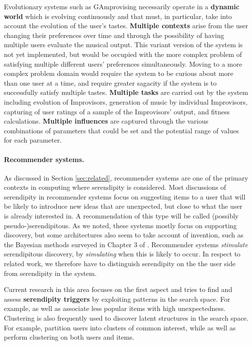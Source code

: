 Evolutionary systems such as {\sf GAmprovising} necessarily operate in a \textbf{dynamic world} which is evolving continuously and that must, in particular, take into account the evolution of the user's tastes. \textbf{Multiple contexts} arise from  the user changing their preferences over time and through the possibility of having multiple users evaluate the musical output.  This variant version of the system is not yet implemented, but would be occupied with the more complex problem of satisfying multiple different users' preferences simultaneously.  Moving to a more complex problem domain would require the system to be curious about more than one user at a time, and require greater sagacity if the system is to successfully satisfy multiple tastes.  \textbf{Multiple tasks} are carried out by the system including evolution of Improvisors, generation of music by individual Improvisors, capturing of user ratings of a sample of the Improvisors' output, and fitness calculations.  \textbf{Multiple influences} are captured through the various combinations of parameters that could be set and the potential range of values for each parameter. 

\paragraph{Recommender systems.} 
As discussed in Section \ref{sec:related}, recommender systems are one
of the primary contexts in computing where serendipity is considered. Most discussions of serendipity in recommender systems focus on suggesting items to a user that will be likely to introduce new ideas that are unexpected, but close to what the user is already interested in. A recommendation of this type will be called (possibly \mbox{pseudo-)serendipitous}. As we noted, these systems mostly focus on supporting discovery, but some architectures also seem to take account of invention, such as the Bayesian methods surveyed in Chapter 3 of . Recommender systems \emph{stimulate} serendipitous discovery, by \emph{simulating} when this is likely to occur. In respect to related work, we therefore have to distinguish serendipity on the the user side from serendipity in the system. 

Current research in this area focuses on the first aspect and tries to find and assess \textbf{serendipity triggers} by exploiting patterns in the search space. For example,  as well as  associate less popular items with high unexpectedness. Clustering is also frequently used to discover latent structures in the search space. For example,  partition users into clusters of common interest, while  as well as  perform clustering on both users and items. %

